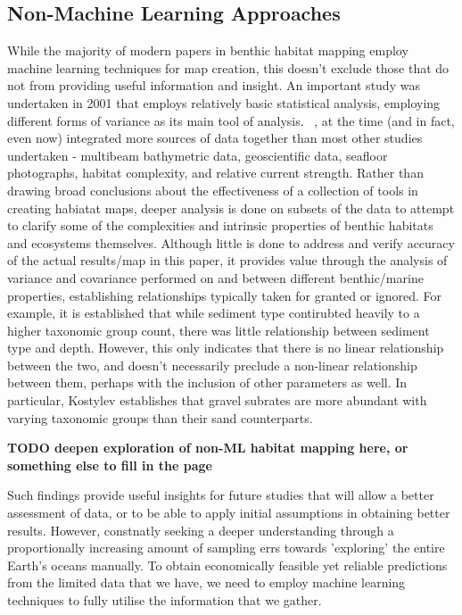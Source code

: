 \documentclass[12pt]{article}
\begin{document}
            \subsection{Non-Machine Learning Approaches} 
            While the majority of modern papers in benthic habitat mapping employ machine learning techniques for map creation, this doesn't exclude those that do not from providing useful information and insight. An important study was undertaken in 2001 that employs relatively basic statistical analysis, employing different forms of variance as its main tool of analysis. ~\citep*{kostylev01}, at the time (and in fact, even now) integrated more sources of data together than most other studies undertaken - multibeam bathymetric data, geoscientific data, seafloor photographs, habitat complexity, and relative current strength. Rather than drawing broad conclusions about the effectiveness of a collection of tools in creating habiatat maps, deeper analysis is done on subsets of the data to attempt to clarify some of the complexities and intrinsic properties of benthic habitats and ecosystems themselves. Although little is done to address and verify accuracy of the actual results/map in this paper, it provides value through the analysis of variance and covariance performed on and between different benthic/marine properties, establishing relationships typically taken for granted or ignored. For example, it is established that while sediment type contirubted heavily to a higher taxonomic group count, there was little relationship between sediment type and depth. However, this only indicates that there is no linear relationship between the two, and doesn't necessarily preclude a non-linear relationship between them, perhaps with the inclusion of other parameters as well. In particular, Kostylev establishes that gravel subrates are more abundant with varying taxonomic groups than their sand counterparts.

            \textbf{TODO deepen exploration of non-ML habitat mapping here, or something else to fill in the page}

            Such findings provide useful insights for future studies that will allow a better assessment of data, or to be able to apply initial assumptions in obtaining better results. However, constnatly seeking a deeper understanding through a proportionally increasing amount of sampling errs towards 'exploring' the entire Earth's oceans manually. To obtain economically feasible yet reliable predictions from the limited data that we have, we need to employ machine learning techniques to fully utilise the information that we gather.
\end{document}
